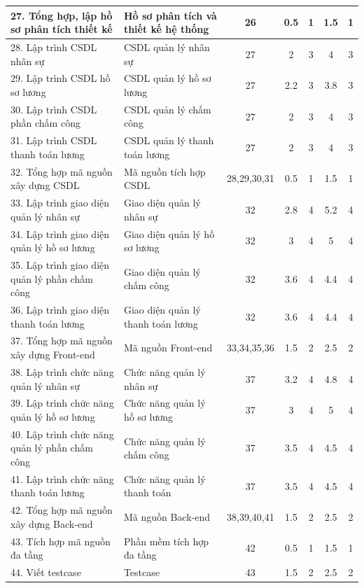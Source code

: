 \begin{longtable}{|p{5cm}|p{5cm}|c|c|c|c|c|}
    27. Tổng hợp, lập hồ sơ phân tích thiết kế & Hồ sơ phân tích và thiết kế hệ thống & 26 & 0.5 & 1 & 1.5 & 1 \\ \hline
    28. Lập trình CSDL nhân sự & CSDL quản lý nhân sự & 27 & 2 & 3 & 4 & 3 \\ \hline
    29. Lập trình CSDL hồ sơ lương & CSDL quản lý hồ sơ lương & 27 & 2.2 & 3 & 3.8 & 3 \\ \hline
    30. Lập trình CSDL phần chấm công & CSDL quản lý chấm công & 27 & 2 & 3 & 4 & 3 \\ \hline
    31. Lập trình CSDL thanh toán lương & CSDL quản lý thanh toán lương & 27 & 2 & 3 & 4 & 3 \\ \hline
    32. Tổng hợp mã nguồn xây dựng CSDL & Mã nguồn tích hợp CSDL & 28,29,30,31 & 0.5 & 1 & 1.5 & 1 \\ \hline
    33. Lập trình giao diện quản lý nhân sự & Giao diện quản lý nhân sự & 32 & 2.8 & 4 & 5.2 & 4 \\ \hline
    34. Lập trình giao diện quản lý hồ sơ lương & Giao diện quản lý hồ sơ lương & 32 & 3 & 4 & 5 & 4 \\ \hline
    35. Lập trình giao diện quản lý phần chấm công & Giao diện quản lý chấm công & 32 & 3.6 & 4 & 4.4 & 4 \\ \hline
    36. Lập trình giao diện thanh toán lương & Giao diện quản lý thanh toán lương & 32 & 3.6 & 4 & 4.4 & 4 \\ \hline
    37. Tổng hợp mã nguồn xây dựng Front-end & Mã nguồn Front-end & 33,34,35,36 & 1.5 & 2 & 2.5 & 2 \\ \hline
    38. Lập trình chức năng quản lý nhân sự & Chức năng quản lý nhân sự & 37 & 3.2 & 4 & 4.8 & 4 \\ \hline
    39. Lập trình chức năng quản lý hồ sơ lương & Chức năng quản lý hồ sơ lương & 37 & 3 & 4 & 5 & 4 \\ \hline
    40. Lập trình chức năng quản lý phần chấm công & Chức năng quản lý chấm công & 37 & 3.5 & 4 & 4.5 & 4 \\ \hline
    41. Lập trình chức năng thanh toán lương & Chức năng quản lý thanh toán & 37 & 3.5 & 4 & 4.5 & 4 \\ \hline
    42. Tổng hợp mã nguồn xây dựng Back-end & Mã nguồn Back-end & 38,39,40,41 & 1.5 & 2 & 2.5 & 2 \\ \hline
    43. Tích hợp mã nguồn đa tầng & Phần mềm tích hợp đa tầng & 42 & 0.5 & 1 & 1.5 & 1 \\ \hline
    44. Viết testcase & Testcase & 43 & 1.5 & 2 & 2.5 & 2 \\ \hline

\end{longtable}
